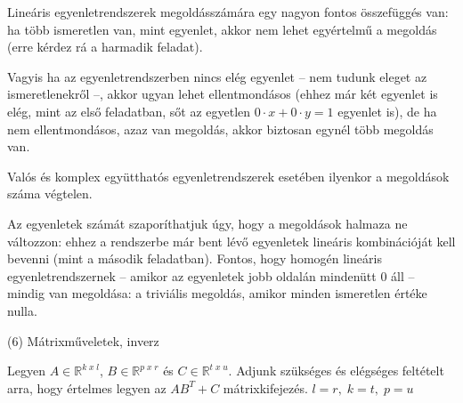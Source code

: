 \begin{frame}
  \begin{tcolorbox}[title={Megoldás {\symking}}]
Lineáris egyenletrendszerek megoldásszámára egy nagyon fontos összefüggés van: ha több ismeretlen van, mint egyenlet, akkor nem lehet egyértelmű a megoldás (erre kérdez rá a harmadik feladat).\\
\mmedskip

Vagyis ha az egyenletrendszerben nincs elég egyenlet – nem tudunk eleget az ismeretlenekről –, akkor ugyan lehet ellentmondásos (ehhez már két egyenlet is elég, mint az első feladatban, sőt az egyetlen $0 \cdot x + 0 \cdot y = 1$ egyenlet is), de ha nem ellentmondásos, azaz van megoldás, akkor biztosan egynél több megoldás van.\\
\mmedskip

Valós és komplex együtthatós egyenletrendszerek esetében ilyenkor a megoldások száma végtelen.\\
\mmedskip

Az egyenletek számát szaporíthatjuk úgy, hogy a megoldások halmaza ne változzon: ehhez a rendszerbe már bent lévő egyenletek lineáris kombinációját kell bevenni (mint a második feladatban). Fontos, hogy homogén lineáris egyenletrendszernek – amikor az egyenletek jobb oldalán mindenütt 0 áll – mindig van megoldása: a triviális megoldás, amikor minden ismeretlen értéke nulla.
  \end{tcolorbox}
\end{frame}



\begin{frame}[plain]
\begin{tcolorbox}[center, colback={myyellow}, coltext={black}, colframe={myyellow}]
    {\RHuge  (6) Mátrixműveletek, inverz }
    \mmedskip
\end{tcolorbox}
\end{frame}

\begin{frame}
  \begin{tcolorbox}[title={6/1. {\symknight}}]
    Legyen $A \in \mathbb{R}^{k \; x \; l}$, $B \in \mathbb{R}^{p \; x \; r}$ és $C \in \mathbb{R}^{t \; x \; u}$. Adjunk szükséges és elégséges feltételt arra, hogy értelmes legyen az $AB^T + C$ mátrixkifejezés.
  \tcblower
    $l = r, \; k = t, \; p = u$
  \end{tcolorbox}
\end{frame}


